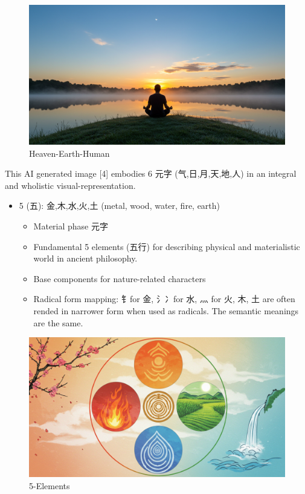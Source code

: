 \documentclass[
  11pt,
  letterpaper,
]{article}
\providecommand{\tightlist}{%
  \setlength{\itemsep}{0pt}\setlength{\parskip}{0pt}}
\begin{document}
\begin{figure}
\centering
\includegraphics{./images/sun-moon-heaven-human-earth-meditation-morning.jpg}
\caption{Heaven-Earth-Human}
\end{figure}

This AI generated image {[}4{]} embodies 6 元字 (气,日,月,天,地,人) in
an integral and wholistic visual-representation.

\begin{itemize}
\tightlist
\item
  5 (五): 金,木,水,火,土 (metal, wood, water, fire, earth)

  \begin{itemize}
  \tightlist
  \item
    Material phase 元字
  \item
    Fundamental 5 elements (五行) for describing physical and
    materialistic world in ancient philosophy.
  \item
    Base components for nature-related characters
  \item
    Radical form mapping: 钅for 金, 氵冫for 水, 灬 for 火, 木, 土 are
    often rended in narrower form when used as radicals. The semantic
    meanings are the same.
  \end{itemize}
\end{itemize}

\begin{figure}
\centering
\includegraphics{./images/five-elements.jpg}
\caption{5-Elements}
\end{figure}
\end{document}
